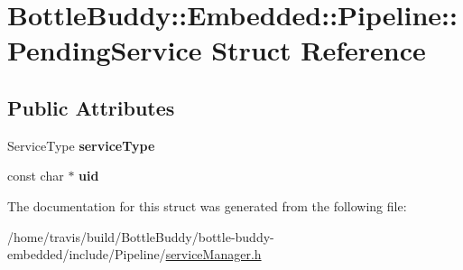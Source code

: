 \hypertarget{struct_bottle_buddy_1_1_embedded_1_1_pipeline_1_1_pending_service}{}\section{Bottle\+Buddy\+:\+:Embedded\+:\+:Pipeline\+:\+:Pending\+Service Struct Reference}
\label{struct_bottle_buddy_1_1_embedded_1_1_pipeline_1_1_pending_service}
\subsection*{Public Attributes}
\begin{DoxyCompactItemize}
\item 
Service\+Type {\bfseries service\+Type}\hypertarget{struct_bottle_buddy_1_1_embedded_1_1_pipeline_1_1_pending_service_aebbf3dc0ea2ca5a53d8a14620b11b157}{}\label{struct_bottle_buddy_1_1_embedded_1_1_pipeline_1_1_pending_service_aebbf3dc0ea2ca5a53d8a14620b11b157}

\item 
const char $\ast$ {\bfseries uid}\hypertarget{struct_bottle_buddy_1_1_embedded_1_1_pipeline_1_1_pending_service_a1df5c11180f83e1a27eceabd439e2000}{}\label{struct_bottle_buddy_1_1_embedded_1_1_pipeline_1_1_pending_service_a1df5c11180f83e1a27eceabd439e2000}

\end{DoxyCompactItemize}


The documentation for this struct was generated from the following file\+:\begin{DoxyCompactItemize}
\item 
/home/travis/build/\+Bottle\+Buddy/bottle-\/buddy-\/embedded/include/\+Pipeline/\hyperlink{service_manager_8h}{service\+Manager.\+h}\end{DoxyCompactItemize}
